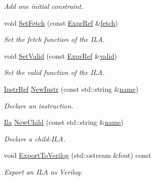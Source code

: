 \begin{DoxyCompactItemize}
\begin{DoxyCompactList}\small\item\em Add one initial constraint. \end{DoxyCompactList}\item 
void \mbox{\hyperlink{classilang_1_1_ila_a13311b670d91f92bce21835231b33c1d}{Set\+Fetch}} (const \mbox{\hyperlink{classilang_1_1_expr_ref}{Expr\+Ref}} \&\mbox{\hyperlink{classilang_1_1_ila_a88022eda9900c50563ac6d0cfd3820f8}{fetch}})
\begin{DoxyCompactList}\small\item\em Set the fetch function of the I\+LA. \end{DoxyCompactList}\item 
void \mbox{\hyperlink{classilang_1_1_ila_a68c51d944fab4a623be6af022a579afc}{Set\+Valid}} (const \mbox{\hyperlink{classilang_1_1_expr_ref}{Expr\+Ref}} \&\mbox{\hyperlink{classilang_1_1_ila_afe9140d18ae01f7956c136ea40b1dba7}{valid}})
\begin{DoxyCompactList}\small\item\em Set the valid function of the I\+LA. \end{DoxyCompactList}\item 
\mbox{\hyperlink{classilang_1_1_instr_ref}{Instr\+Ref}} \mbox{\hyperlink{classilang_1_1_ila_ac154deacddf086c175365744490a6405}{New\+Instr}} (const std\+::string \&\mbox{\hyperlink{classilang_1_1_ila_aef59c0b294a99f65ce5dccef8dd1ccb7}{name}})
\begin{DoxyCompactList}\small\item\em Declare an instruction. \end{DoxyCompactList}\item 
\mbox{\hyperlink{classilang_1_1_ila}{Ila}} \mbox{\hyperlink{classilang_1_1_ila_aececb677cbc28452afa22f90da102022}{New\+Child}} (const std\+::string \&\mbox{\hyperlink{classilang_1_1_ila_aef59c0b294a99f65ce5dccef8dd1ccb7}{name}})
\begin{DoxyCompactList}\small\item\em Declare a child-\/\+I\+LA. \end{DoxyCompactList}\item 
void \mbox{\hyperlink{classilang_1_1_ila_a08499172526aea2df0a58420de5eab44}{Export\+To\+Verilog}} (std\+::ostream \&fout) const
\begin{DoxyCompactList}\small\item\em Export an I\+LA as Verilog. \end{DoxyCompactList}\item 

\end{DoxyCompactItemize}
